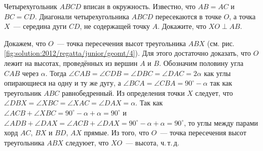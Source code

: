 Четырехугольник $ABCD$ вписан в окружность.
Известно, что $AB = AC$ и $BC = CD$.
Диагонали четырехугольника $ABCD$ пересекаются в точке $O$, а точка $X$~---
середина дуги $CD$, не содержащей точку $A$. Докажите, что $XO \perp AB$.

%
\label{solution:2012/regatta/junior/geomt/4}%
Докажем, что $O$~--- точка пересечения высот треугольника $ABX$
(см. рис. \ref{fig:solution:2012/regatta/junior/geomt/4}).
Для этого достаточно доказать, что $O$ лежит на высотах, проведённых из вершин
$A$ и $B$.
Обозначим половину угла $CAB$ через $\alpha$.
Тогда
$\angle CAB = \angle CDB = \angle DBC = \angle DAC = 2 \alpha$
как углы опирающиеся на одну и ту же дугу, а
$\angle BCA = \angle CBA = 90^\circ - \alpha$
так как треугольник $ABC$ равнобедренный.
Из определения точки $X$ следует, что
$\angle DBX = \angle XBC = \angle XAC = \angle DAX = \alpha$.
Так как
\(
    \angle ACB + \angle XBC
=
    90^\circ - \alpha + \alpha
=
    90^\circ
\)
и
\(
    \angle ADB + \angle DAX
=
    \angle ACB + \angle DAX
=
    90^\circ - \alpha + \alpha
=
    90^\circ
\),
то углы между парами хорд $AC$, $BX$ и $BD$, $AX$ прямые.
Из того, что $O$~--- точка пересечения высот треугольника $ABX$ следуюет, что
$XO$~--- высота, ч.\,т.\,д.

